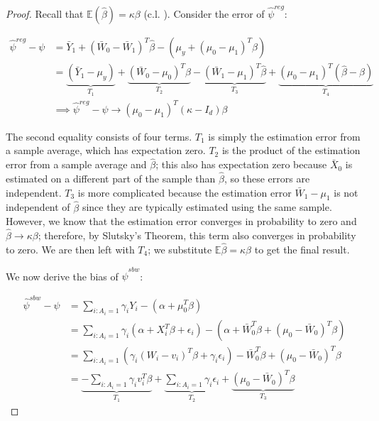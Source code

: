 \begin{proof}
Recall that $\mathbb{E}(\hat{\beta}) = \kappa\beta$ (c.l. \cite{gleser1992importance}). Consider the error of $\hat{\psi}^{reg}$: 

\begin{align*}
    \hat{\psi}^{reg} - \psi &= \bar{Y}_1 + (\bar{W}_0 - \bar{W}_1)^T\hat{\beta} - (\mu_y + (\mu_0 - \mu_1)^T\beta) \\
    &= \underbrace{(\bar{Y}_1 - \mu_y)}_{T_1} + \underbrace{(\bar{W}_0 - \mu_0)^T\hat{\beta}}_{T_2} - \underbrace{(\bar{W}_1 - \mu_1)^T\hat{\beta}}_{T_3} + \underbrace{(\mu_0 - \mu_1)^T(\hat{\beta} - \beta)}_{T_4} \\
    &\implies \hat{\psi}^{reg} - \psi \to (\mu_0 - \mu_1)^T(\kappa - I_d)\beta
\end{align*}

The second equality consists of four terms. $T_1$ is simply the estimation error from a sample average, which has expectation zero. $T_2$ is the product of the estimation error from a sample average and $\hat{\beta}$; this also has expectation zero because $\bar{X}_0$ is estimated on a different part of the sample than $\hat{\beta}$, so these errors are independent. $T_3$ is more complicated because the estimation error $\bar{W}_1 - \mu_1$ is not independent of $\hat{\beta}$ since they are typically estimated using the same sample. However, we know that the estimation error converges in probability to zero and $\hat{\beta} \to \kappa\beta$; therefore, by Slutsky's Theorem, this term also converges in probability to zero. We are then left with $T_4$; we substitute $\mathbb{E}{\hat{\beta}} = \kappa\beta$ to get the final result. 

We now derive the bias of $\hat{\psi}^{sbw}$:

\begin{align*}
    \hat{\psi}^{sbw} - \psi &= \sum_{i: A_i = 1}\gamma_iY_i - (\alpha + \mu_0^T\beta) \\
    &= \sum_{i: A_i = 1} \gamma_i(\alpha + X_i^T\beta + \epsilon_i) - (\alpha + \bar{W}_0^T\beta + (\mu_0 - \bar{W}_0)^T\beta) \\
    &= \sum_{i: A_i = 1} (\gamma_i(W_i - v_i)^T\beta + \gamma_i\epsilon_i) - \bar{W}_0^T\beta + (\mu_0 - \bar{W}_0)^T\beta \\
    &= \underbrace{-\sum_{i: A_i = 1}\gamma_iv_i^T\beta}_{T_1} + \underbrace{\sum_{i: A_i = 1}\gamma_i\epsilon_i}_{T_2}  + \underbrace{(\mu_0 - \bar{W}_0)^T\beta}_{T_3}
\end{align*}


\end{proof}
